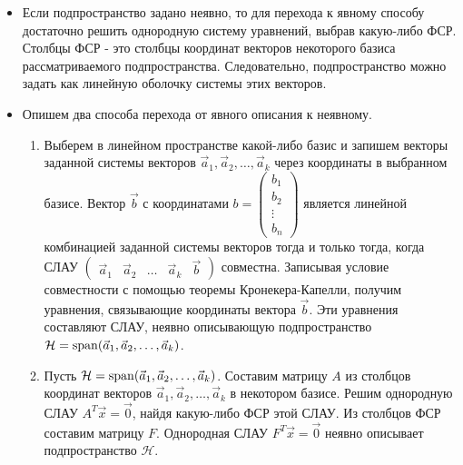 \begin{itemize}
    \item Если подпространство задано неявно, то для перехода к явному способу достаточно решить однородную систему уравнений, выбрав какую-либо ФСР. Столбцы ФСР - это столбцы координат векторов некоторого базиса рассматриваемого подпространства. Следовательно, подпространство можно задать как линейную оболочку системы этих векторов.
    \item Опишем два способа перехода от явного описания к неявному.

    \begin{enumerate}
        \item Выберем в линейном пространстве какой-либо базис и запишем векторы заданной системы векторов $\vec{a}_1, \vec{a}_2, \ldots, \vec{a}_k$ через координаты в выбранном базисе. Вектор $\vec{b}$ с координатами $b = \begin{pmatrix}
            b_1 \\
            b_2 \\
            \vdots \\
            b_n
        \end{pmatrix}$ является линейной комбинацией заданной системы векторов тогда и только тогда, когда СЛАУ $\begin{pmatrix}
            \vec{a}_1 & \vec{a}_2 & \ldots & \vec{a}_k & \vec{b}
        \end{pmatrix}$ совместна. Записывая условие совместности с помощью теоремы Кронекера-Капелли, получим уравнения, связывающие координаты вектора $\vec{b}$. Эти уравнения составляют СЛАУ, неявно описывающую подпространство $\mathcal{H} = \operatorname{\mathop{\mathrm{span}}}(\vec{a}_1, \vec{a}_2, \ldots, \vec{a}_k)$.
    
    \item Пусть $\mathcal{H} = \operatorname{\mathop{\mathrm{span}}}(\vec{a}_1, \vec{a}_2, \ldots, \vec{a}_k)$. Составим матрицу $A$ из столбцов координат векторов $\vec{a}_1, \vec{a}_2, \ldots, \vec{a}_k$ в некотором базисе. Решим однородную СЛАУ $A^T\vec{x} = \vec{0}$, найдя какую-либо ФСР этой СЛАУ. Из столбцов ФСР составим матрицу $F$. Однородная СЛАУ $F^T\vec{x} = \vec{0}$ неявно описывает подпространство $\mathcal{H}$.
    \end{enumerate}
\end{itemize}
